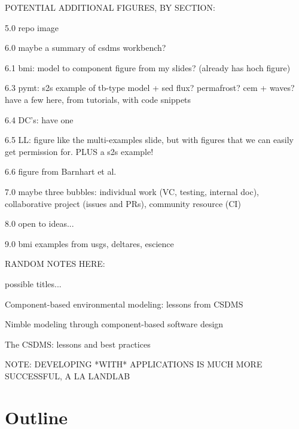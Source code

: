 \documentclass[12pt]{amsart}
\begin{document}
 












\newpage

POTENTIAL ADDITIONAL FIGURES, BY SECTION:

5.0 repo image

6.0 maybe a summary of csdms workbench?

6.1 bmi: model to component figure from my slides? (already has hoch figure)

6.3 pymt: s2s example of tb-type model + sed flux? permafrost? cem + waves? have a few here, from tutorials, with code snippets

6.4 DC's: have one

6.5 LL: figure like the multi-examples slide, but with figures that we can easily get permission for. PLUS a s2s example!

6.6 figure from Barnhart et al.

7.0 maybe three bubbles: individual work (VC, testing, internal doc), collaborative project (issues and PRs), community resource (CI)

8.0 open to ideas...

9.0 bmi examples from usgs, deltares, escience







RANDOM NOTES HERE:

possible titles...

Component-based environmental modeling: lessons from CSDMS

Nimble modeling through component-based software design

The CSDMS: lessons and best practices



NOTE: DEVELOPING *WITH* APPLICATIONS IS MUCH MORE SUCCESSFUL, A LA LANDLAB




\section*{Outline}
\end{document}

